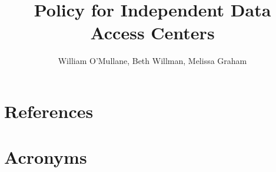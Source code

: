 \documentclass[LPM,lsstdraft]{lsstdoc}
\title[Discributed DACs  ]{Policy for Independent Data Access Centers}
\author   {William O'Mullane, Beth Willman, Melissa Graham }
\begin{document}
%
%
\maketitle

\renewcommand{\thepage}{\arabic{page}}%

\setcounter{page}{1}%
%
%


\section{References\label{sect:references}}
\renewcommand{\refname}{}


\section{Acronyms}
\end{document}
